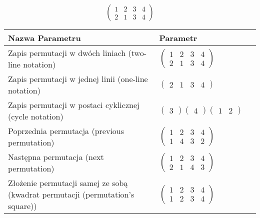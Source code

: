 \documentclass[12pt]{article}
\begin{document}
\subsection{}
\begin{center}
\[
\begin{pmatrix}
	1 & 2 & 3 & 4 \\ 
	2 & 1 & 3 & 4 
\end{pmatrix}
\]

\begin{tabular}{|m{0.6\linewidth}|m{0.4\linewidth}|}
	\hline
	Nazwa Parametru & Parametr \\
	\hline
	Zapis permutacji w dwóch liniach (two-line notation) & $\begin{pmatrix} 1 & 2 & 3 & 4 \\ 
2 & 1 & 3 & 4 \end{pmatrix}$ \\ 
	\hline
	Zapis permutacji w jednej linii (one-line notation) & $\begin{pmatrix} 2 & 1 & 3 & 4 \end{pmatrix}$ \\ 
	\hline
	Zapis permutacji w postaci cyklicznej (cycle notation) & $\begin{pmatrix} 3 \end{pmatrix} \begin{pmatrix} 4 \end{pmatrix} \begin{pmatrix} 1 & 2 \end{pmatrix} $ \\ 
	\hline
	Poprzednia permutacja (previous permutation) & $\begin{pmatrix} 1 & 2 & 3 & 4 \\ 
1 & 4 & 3 & 2 \end{pmatrix}$ \\ 
	\hline
	Następna permutacja (next permutation) & $\begin{pmatrix} 1 & 2 & 3 & 4 \\ 
2 & 1 & 4 & 3 \end{pmatrix}$ \\ 
	\hline
	Złożenie permutacji samej ze sobą (kwadrat permutacji (permutation's square)) & $\begin{pmatrix} 1 & 2 & 3 & 4 \\ 
1 & 2 & 3 & 4 \end{pmatrix}$ \\ 
	\hline
\end{tabular}
\end{center}
\end{document}
